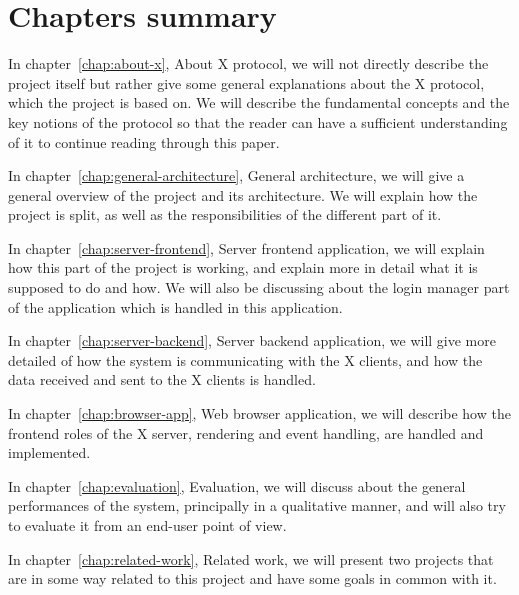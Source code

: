 \section{Chapters summary}
In chapter~\ref{chap:about-x}, About X protocol,
we will not directly describe the project itself but rather give 
some general explanations about the X protocol, which the project is based on.
We will describe the fundamental concepts and the key notions of the protocol 
so that the reader can have a sufficient understanding of it to continue reading 
through this paper.

In chapter~\ref{chap:general-architecture}, General architecture, we will give a general overview of the 
project and its architecture. We will explain how the project is split, as well as the 
responsibilities of the different part of it.

In chapter~\ref{chap:server-frontend}, Server frontend application, we will explain 
how this part of the project is working, and explain more in detail what it is supposed to do 
and how. We will also be discussing about the login manager part of the application which is
handled in this application.

In chapter~\ref{chap:server-backend}, Server backend application, we will give 
more detailed of how the system is communicating with the X clients, and how the 
data received and sent to the X clients is handled.

In chapter~\ref{chap:browser-app}, Web browser application, we will describe
how the frontend roles of the X server, rendering and event handling, are handled and 
implemented. 

In chapter~\ref{chap:evaluation}, Evaluation, we will discuss about the general 
performances of the system, principally in a qualitative manner, and will also 
try to evaluate it from an end-user point of view.

In chapter~\ref{chap:related-work}, Related work, we will present two projects that 
are in some way related to this project and have some goals in common with it.